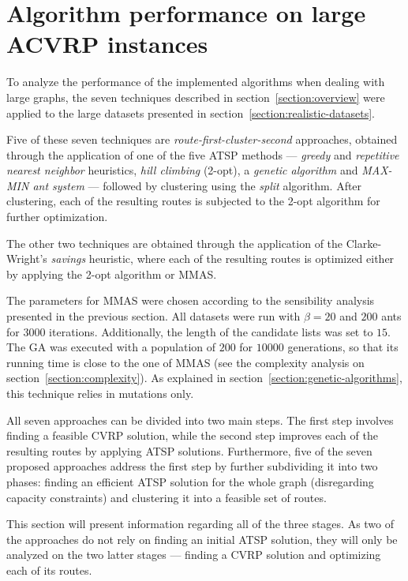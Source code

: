 \section{Algorithm performance on large ACVRP instances}
\label{sec:results}

To analyze the performance of the implemented algorithms when dealing with large
graphs, the seven techniques described in section~\ref{section:overview} were
applied to the large datasets presented in
section~\ref{section:realistic-datasets}.

Five of these seven techniques are \textit{route-first-cluster-second}
approaches, obtained through the application of one of the five ATSP methods ---
\textit{greedy} and \textit{repetitive nearest neighbor} heuristics,
\textit{hill climbing} (2-opt), a \textit{genetic algorithm} and \textit{MAX-MIN
ant system} --- followed by clustering using the \textit{split} algorithm. After
clustering, each of the resulting routes is subjected to the 2-opt algorithm
for further optimization.

The other two techniques are obtained through the application of the
Clarke-Wright's \textit{savings} heuristic, where each of the resulting routes
is optimized either by applying the 2-opt algorithm or MMAS.

The parameters for MMAS were chosen according to the sensibility analysis
presented in the previous section. All datasets were run with $\beta = 20$ and
$200$ ants for $3000$ iterations. Additionally, the length of the candidate
lists was set to $15$. The GA was executed with a population of $200$ for
$10000$ generations, so that its running time is close to the one of MMAS (see
the complexity analysis on section~\ref{section:complexity}). As explained in
section~\ref{section:genetic-algorithms}, this technique relies in mutations
only. 

All seven approaches can be divided into two main steps. The first step involves
finding a feasible CVRP solution, while the second step improves each of the
resulting routes by applying ATSP solutions. Furthermore, five of the seven
proposed approaches address the first step by further subdividing it into two
phases: finding an efficient ATSP solution for the whole graph (disregarding
capacity constraints) and clustering it into a feasible set of routes.

This section will present information regarding all of the three stages. As two
of the approaches do not rely on finding an initial ATSP solution, they will
only be analyzed on the two latter stages --- finding a CVRP solution and
optimizing each of its routes.

